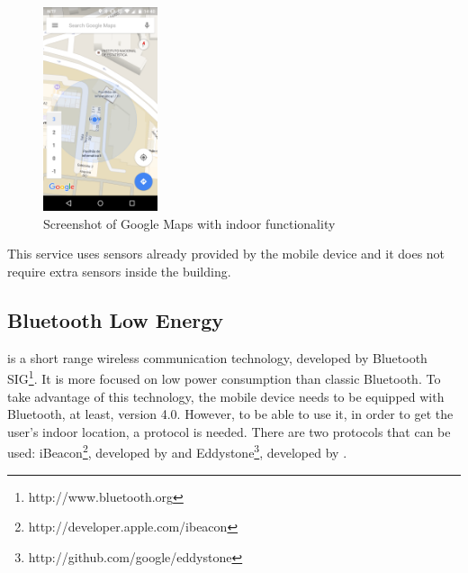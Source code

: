 \begin{figure}[!ht]
  \centering
    \includegraphics[width=0.3\textwidth, keepaspectratio]{images/screenshots/google_maps_indoor}
    \caption[Google Maps Indoor]{Screenshot of Google Maps with indoor functionality}
    \label{fig:google_maps_indoor}
\end{figure}

This service uses sensors already provided by the mobile device and it does not require extra sensors inside the building.

\subsection{Bluetooth Low Energy}
\label{sub:background_bluetooth_low_energy}
\cite{ble} is a short range wireless communication technology, developed by Bluetooth \gls{SIG}\footnote{http://www.bluetooth.org}.
It is more focused on low power consumption than classic Bluetooth.
To take advantage of this technology, the mobile device needs to be equipped with Bluetooth, at least, version 4.0\cite{bluetooth_specification}.
However, to be able to use it, in order to get the user's indoor location, a protocol is needed.
There are two protocols that can be used: iBeacon\footnote{http://developer.apple.com/ibeacon}, developed by  and Eddystone\footnote{http://github.com/google/eddystone}, developed by .

